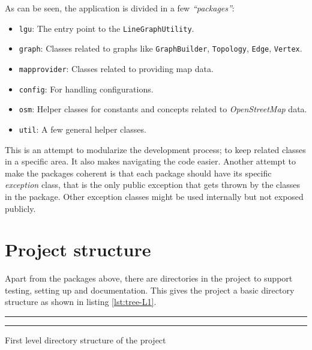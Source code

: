 \documentclass[../main.tex]{subfiles}
\begin{document}
\vspace{1em}
\noindent

As can be seen, the application is divided in a few \textit{``packages''}:

\begin{itemize}
    \item \texttt{lgu}: The entry point to the \texttt{LineGraphUtility}.
    \item \texttt{graph}: Classes related to graphs like \texttt{GraphBuilder}, \texttt{Topology}, \texttt{Edge}, \texttt{Vertex}.
    \item \texttt{mapprovider}: Classes related to providing map data.
    \item \texttt{config}: For handling configurations.
    \item \texttt{osm}: Helper classes for constants and concepts related to \textit{OpenStreetMap} data.
    \item \texttt{util}: A few general helper classes.
\end{itemize}

This is an attempt to modularize the development process; to keep related classes in a specific area. It also makes navigating the code easier. Another attempt to make the packages coherent is that each package should have its specific \textit{exception} class, that is the only public exception that gets thrown by the classes in the package. Other exception classes might be used internally but not exposed publicly.

\section{Project structure}
Apart from the packages above, there are directories in the project to support testing, setting up and documentation. This gives the project a basic directory structure as shown in listing \ref{lst:tree-L1}.

\begin{mylisting}
\hrule
\vspace{0.5em}
\vspace{0.5em}
\hrule
\vspace{0.5em}
\caption{First level directory structure of the project}
\label{lst:tree-L1}
\end{mylisting}
\end{document}
